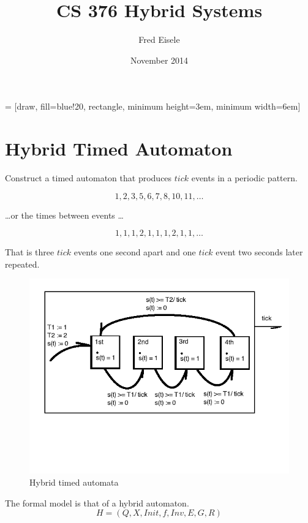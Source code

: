\documentclass{article}
\title{CS 376 Hybrid Systems}
\author{Fred Eisele}
\date{November 2014}
\begin{document}
\maketitle

 = [draw, fill=blue!20, rectangle,
    minimum height=3em, minimum width=6em]


\section{Hybrid Timed Automaton}
Construct a timed automaton that produces $tick$
events in a periodic pattern.

\begin{equation}
1, 2, 3, 5, 6, 7 ,8, 10, 11, \ldots
\end{equation}

\ldots or the times between events \ldots

\begin{equation}
1, 1, 1, 2, 1, 1, 1, 2, 1, 1, \ldots
\end{equation}

That is three $tick$ events one second apart
and one $tick$ event two seconds later repeated.

\begin{figure}[h!]
\centering
\includegraphics[scale=0.7]{hw7_1_actor_detail.png}
\caption{Hybrid timed automata}
\label{fig:time_automata}
\end{figure}

The formal model is that of a hybrid automaton.
\begin{equation}
H = (Q, X, Init, f, Inv, E, G, R)
\end{equation}
\end{document}
